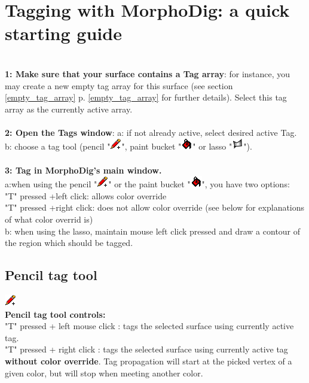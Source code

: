 \section{Tagging with MorphoDig: a quick starting guide}\label{tag_starting_guide}
\textbf{\underline{}}\\
\textbf{1: Make sure that your surface contains a Tag array}: for instance, you may create a new empty tag array for this surface (see section \ref{empty_tag_array} p. \ref{empty_tag_array} for further details). Select this tag array as the currently active array.\\\\
\noindent
\textbf{2: Open the Tags window}: a: if not already active, select desired active Tag. b: choose a tag tool (pencil "\includegraphics[scale=0.7]{images/12/pencil.png}", paint bucket "\includegraphics[scale=0.7]{images/12/paint_bucket.png}" or lasso "\includegraphics[scale=0.7]{images/12/lasso.png}").  \\\\
\noindent
\textbf{3: Tag in MorphoDig's main window.} \\ a:when using the pencil "\includegraphics[scale=0.7]{images/12/pencil.png}" or the paint bucket "\includegraphics[scale=0.7]{images/12/paint_bucket.png}", you have two options:\\
 "T" pressed +left click: allows color override\\
 "T" pressed +right click: does not allow color override (see below for explanations of what color overrid is)\\
b: when using the lasso, maintain mouse left click pressed and draw a contour of the region which should be tagged.



\subsection{Pencil tag tool}
\includegraphics[scale=0.7]{images/12/pencil.png}\\
\textbf{Pencil tag tool controls:}\\
"T" pressed + left mouse click : tags the selected surface using currently active tag.\\
"T" pressed + right click : tags the selected surface using currently active tag \textbf{without color override}. Tag propagation will start at the picked vertex of a given color, but will stop when meeting another color.\\

